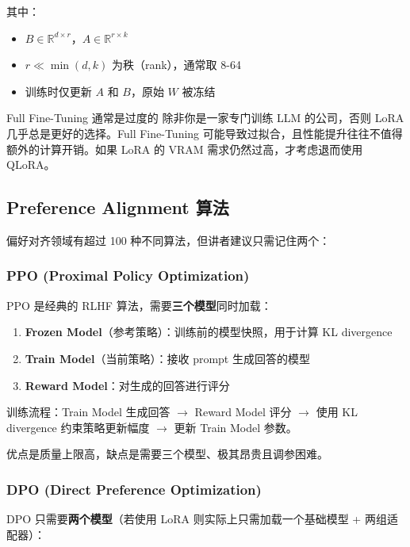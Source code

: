 其中：
\begin{itemize}
    \item $B \in \mathbb{R}^{d \times r}$，$A \in \mathbb{R}^{r \times k}$
    \item $r \ll \min(d, k)$ 为秩（rank），通常取 8-64
    \item 训练时仅更新 $A$ 和 $B$，原始 $W$ 被冻结
\end{itemize}

\begin{warningbox}{Full Fine-Tuning 通常是过度的}
除非你是一家专门训练 LLM 的公司，否则 LoRA 几乎总是更好的选择。Full Fine-Tuning 可能导致过拟合，且性能提升往往不值得额外的计算开销。如果 LoRA 的 VRAM 需求仍然过高，才考虑退而使用 QLoRA。
\end{warningbox}

\subsection{Preference Alignment 算法}

偏好对齐领域有超过 100 种不同算法，但讲者建议只需记住两个：

\subsubsection{PPO (Proximal Policy Optimization)}

PPO 是经典的 RLHF 算法，需要\textbf{三个模型}同时加载：

\begin{enumerate}
    \item \textbf{Frozen Model}（参考策略）：训练前的模型快照，用于计算 KL divergence
    \item \textbf{Train Model}（当前策略）：接收 prompt 生成回答的模型
    \item \textbf{Reward Model}：对生成的回答进行评分
\end{enumerate}

训练流程：Train Model 生成回答 $\rightarrow$ Reward Model 评分 $\rightarrow$ 使用 KL divergence 约束策略更新幅度 $\rightarrow$ 更新 Train Model 参数。

优点是质量上限高，缺点是需要三个模型、极其昂贵且调参困难。

\subsubsection{DPO (Direct Preference Optimization)}

DPO 只需要\textbf{两个模型}（若使用 LoRA 则实际上只需加载一个基础模型 + 两组适配器）：

